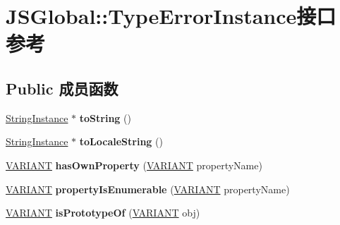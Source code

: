 \hypertarget{interface_j_s_global_1_1_type_error_instance}{}\section{J\+S\+Global\+:\+:Type\+Error\+Instance接口 参考}
\label{interface_j_s_global_1_1_type_error_instance}
\subsection*{Public 成员函数}
\begin{DoxyCompactItemize}
\item 
\mbox{\label{interface_j_s_global_1_1_type_error_instance_adcee9a64e7b024d643f9c5532d868b15}} 
\hyperlink{interface_j_s_global_1_1_string_instance}{String\+Instance} $\ast$ {\bfseries to\+String} ()
\item 
\mbox{\label{interface_j_s_global_1_1_type_error_instance_a641b3d31dd53f446260bf4b98a53d616}} 
\hyperlink{interface_j_s_global_1_1_string_instance}{String\+Instance} $\ast$ {\bfseries to\+Locale\+String} ()
\item 
\mbox{\label{interface_j_s_global_1_1_type_error_instance_a5cd2e190916d4276115427efa87647ea}} 
\hyperlink{structtag_v_a_r_i_a_n_t}{V\+A\+R\+I\+A\+NT} {\bfseries has\+Own\+Property} (\hyperlink{structtag_v_a_r_i_a_n_t}{V\+A\+R\+I\+A\+NT} property\+Name)
\item 
\mbox{\label{interface_j_s_global_1_1_type_error_instance_a84e6252adc28e79b7a55bb6e79a89ba7}} 
\hyperlink{structtag_v_a_r_i_a_n_t}{V\+A\+R\+I\+A\+NT} {\bfseries property\+Is\+Enumerable} (\hyperlink{structtag_v_a_r_i_a_n_t}{V\+A\+R\+I\+A\+NT} property\+Name)
\item 
\mbox{\label{interface_j_s_global_1_1_type_error_instance_a75adde5a2e429e6d33c6eabf991d59dc}} 
\hyperlink{structtag_v_a_r_i_a_n_t}{V\+A\+R\+I\+A\+NT} {\bfseries is\+Prototype\+Of} (\hyperlink{structtag_v_a_r_i_a_n_t}{V\+A\+R\+I\+A\+NT} obj)
\end{DoxyCompactItemize}
